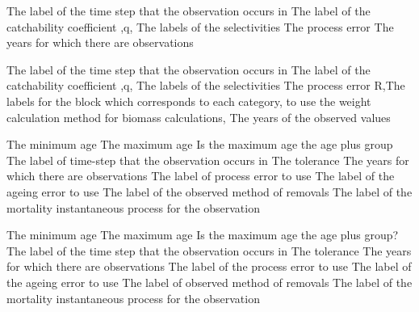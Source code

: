  {The label of the time step that the observation occurs in}
 {The label of the catchability coefficient ,q,}
 {The labels of the selectivities}
 {The process error}
 {The years for which there are observations}
\par\textbf{}\par
{} {The label of the time step that the observation occurs in}
 {The label of the catchability coefficient ,q,}
 {The labels of the selectivities}
 {The process error}
 {R,The labels for the  block which corresponds to each category, to use the weight calculation method for biomass calculations,}
 {The years of the observed values}
\par\textbf{}\par
{} {The minimum age}
 {The maximum age}
 {Is the maximum age the age plus group}
 {The label of time-step that the observation occurs in}
 {The tolerance}
 {The years for which there are observations}
 {The label of process error to use}
 {The label of the ageing error to use}
 {The label of the observed method of removals}
 {The label of the mortality instantaneous process for the observation}
\par\textbf{}\par
{} {The minimum age}
 {The maximum age}
 {Is the maximum age the age plus group?}
 {The label of the time step that the observation occurs in}
 {The tolerance}
 {The years for which there are observations}
 {The label of the process error to use}
 {The label of the ageing error to use}
 {The label of observed method of removals}
 {The label of the mortality instantaneous process for the observation}
\par\textbf{}\par
